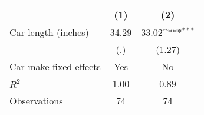 {
\def\sym#1{\ifmmode^{#1}\else\(^{#1}\)\fi}
\begin{tabular}{l*{2}{c}}
\hline\hline
            &\multicolumn{1}{c}{(1)}         &\multicolumn{1}{c}{(2)}         \\
\hline
Car length (inches)&       34.29         &       33.02\sym{***}\\
            &         (.)         &      (1.27)         \\
\hline
Car make fixed effects&         Yes         &          No         \\
$R^{2}$     &        1.00         &        0.89         \\
Observations&          74         &          74         \\
\hline\hline
\end{tabular}
}
